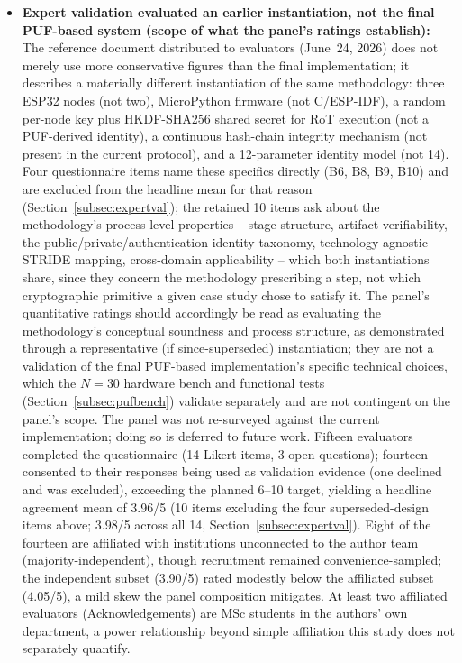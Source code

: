 \documentclass[preprint,12pt,authoryear]{elsarticle}
\begin{document}
\begin{sloppypar}
\begin{itemize}[leftmargin=*]
    \item \textbf{Expert validation evaluated an earlier instantiation, not the final PUF-based system (scope of what the panel's ratings establish):} The reference document distributed to evaluators (June~24, 2026) does not merely use more conservative figures than the final implementation; it describes a materially different instantiation of the same methodology: three ESP32 nodes (not two), MicroPython firmware (not C/ESP-IDF), a random per-node key plus HKDF-SHA256 shared secret for RoT execution (not a PUF-derived identity), a continuous hash-chain integrity mechanism (not present in the current protocol), and a 12-parameter identity model (not 14). Four questionnaire items name these specifics directly (B6, B8, B9, B10) and are excluded from the headline mean for that reason (Section~\ref{subsec:expertval}); the retained 10 items ask about the methodology's process-level properties -- stage structure, artifact verifiability, the public/private/authentication identity taxonomy, technology-agnostic STRIDE mapping, cross-domain applicability -- which both instantiations share, since they concern the methodology prescribing a step, not which cryptographic primitive a given case study chose to satisfy it. The panel's quantitative ratings should accordingly be read as evaluating the methodology's conceptual soundness and process structure, as demonstrated through a representative (if since-superseded) instantiation; they are not a validation of the final PUF-based implementation's specific technical choices, which the $N=30$ hardware bench and functional tests (Section~\ref{subsec:pufbench}) validate separately and are not contingent on the panel's scope. The panel was not re-surveyed against the current implementation; doing so is deferred to future work. Fifteen evaluators completed the questionnaire (14 Likert items, 3 open questions); fourteen consented to their responses being used as validation evidence (one declined and was excluded), exceeding the planned 6--10 target, yielding a headline agreement mean of 3.96/5 (10 items excluding the four superseded-design items above; 3.98/5 across all 14, Section~\ref{subsec:expertval}). Eight of the fourteen are affiliated with institutions unconnected to the author team (majority-independent), though recruitment remained convenience-sampled; the independent subset (3.90/5) rated modestly below the affiliated subset (4.05/5), a mild skew the panel composition mitigates. At least two affiliated evaluators (Acknowledgements) are MSc students in the authors' own department, a power relationship beyond simple affiliation this study does not separately quantify.
\end{itemize}
\end{sloppypar}
\end{document}
